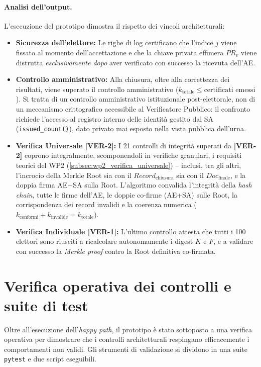 \paragraph{Analisi dell'output.}
L'esecuzione del prototipo dimostra il rispetto dei vincoli architetturali:
\begin{itemize}
  \item \textbf{Sicurezza dell'elettore:} Le righe di log certificano che l'indice $j$ viene fissato al momento dell'accettazione e che la chiave privata effimera $PR_v$ viene distrutta \emph{esclusivamente dopo} aver verificato con successo la ricevuta dell'AE.
  \item \textbf{Controllo amministrativo:} Alla chiusura, oltre alla correttezza dei risultati, viene superato il controllo amministrativo ($k_{\text{totale}} \le \text{certificati emessi}$). Si tratta di un controllo amministrativo istituzionale post-elettorale, non di un meccanismo crittografico accessibile al Verificatore Pubblico: il confronto richiede l'accesso al registro interno delle identità gestito dal SA (\texttt{issued\_count()}), dato privato mai esposto nella vista pubblica dell'urna.
  \item \textbf{Verifica Universale [VER-2]:} I 21 controlli di integrità superati da \textbf{[VER-2]} coprono integralmente, scomponendoli in verifiche granulari, i requisiti teorici del WP2 (\ref{subsec:wp2_verifica_universale}) -- inclusi, tra gli altri, l'incrocio della Merkle Root sia con il $Record_{\text{chiusura}}$ sia con il $Doc_{\text{finale}}$, e la doppia firma AE+SA sulla Root. L'algoritmo convalida l'integrità della \emph{hash chain}, tutte le firme dell'AE, le doppie co-firme (AE+SA) sulle Root, la corrispondenza dei record invalidi e la coerenza numerica ($k_{\text{conformi}} + k_{\text{invalide}} = k_{\text{totale}}$).
  \item \textbf{Verifica Individuale [VER-1]:} L'ultimo controllo attesta che tutti i 100 elettori sono riusciti a ricalcolare autonomamente i digest $K$ e $F$, e a validare con successo la \emph{Merkle proof} contro la Root definitiva co-firmata.
\end{itemize}


\section{Verifica operativa dei controlli e suite di test}
\label{sec:wp4_test}

Oltre all'esecuzione dell'\emph{happy path}, il prototipo è stato sottoposto a una verifica operativa per dimostrare che i controlli architetturali respingano efficacemente i comportamenti non validi. Gli strumenti di validazione si dividono in una suite \texttt{pytest} e due script eseguibili.

